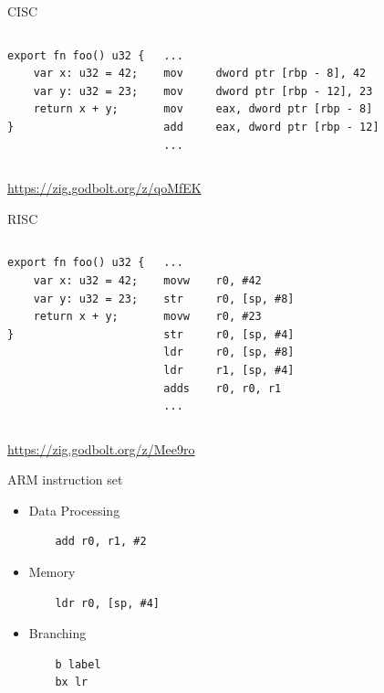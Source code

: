 \documentclass{beamer}
\begin{document}
\begin{frame}[fragile]{CISC}
\begin{columns}
\begin{verbatim}
export fn foo() u32 {
    var x: u32 = 42;
    var y: u32 = 23;
    return x + y;
}
\end{verbatim}

\begin{verbatim}
...
mov     dword ptr [rbp - 8], 42
mov     dword ptr [rbp - 12], 23
mov     eax, dword ptr [rbp - 8]
add     eax, dword ptr [rbp - 12]
...
\end{verbatim}
\end{columns}

\vspace{1cm}

\url{https://zig.godbolt.org/z/qoMfEK}
\end{frame}

\begin{frame}[fragile]{RISC}
\begin{columns}
\begin{verbatim}
export fn foo() u32 {
    var x: u32 = 42;
    var y: u32 = 23;
    return x + y;
}
\end{verbatim}

\begin{verbatim}
...
movw    r0, #42
str     r0, [sp, #8]
movw    r0, #23
str     r0, [sp, #4]
ldr     r0, [sp, #8]
ldr     r1, [sp, #4]
adds    r0, r0, r1
...
\end{verbatim}
\end{columns}

\vspace{1cm}

\url{https://zig.godbolt.org/z/Mee9ro}
\end{frame}

\begin{frame}[fragile]{ARM instruction set}
\begin{itemize}
    \item<1-> Data Processing
    \begin{verbatim}
    add r0, r1, #2\end{verbatim}
    \item<2-> Memory
    \begin{verbatim}
    ldr r0, [sp, #4]\end{verbatim}
    \item<3-> Branching
    \begin{verbatim}
    b label
    bx lr\end{verbatim}
\end{itemize}
\end{frame}
\end{document}
